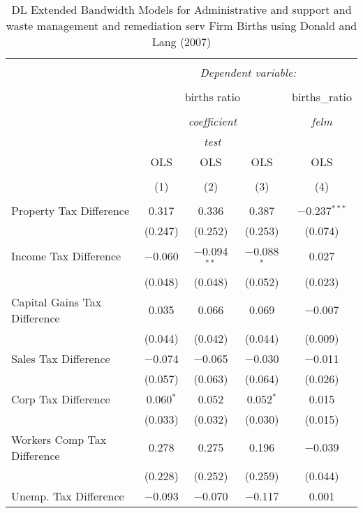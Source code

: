 
\begin{table}[!htbp] \centering 
  \caption{DL Extended Bandwidth Models for  Administrative and support and waste management and remediation serv Firm Births using Donald and Lang (2007)} 
  \label{} 
\begin{tabular}{@{\extracolsep{5pt}}lcccc} 
\\[-1.8ex]\hline 
\hline \\[-1.8ex] 
 & \multicolumn{4}{c}{\textit{Dependent variable:}} \\ 
\cline{2-5} 
\\[-1.8ex] & \multicolumn{3}{c}{births ratio} & births\_ratio \\ 
\\[-1.8ex] & \multicolumn{3}{c}{\textit{coefficient}} & \textit{felm} \\ 
 & \multicolumn{3}{c}{\textit{test}} & \textit{} \\ 
 & OLS & OLS & OLS & OLS \\ 
\\[-1.8ex] & (1) & (2) & (3) & (4)\\ 
\hline \\[-1.8ex] 
 Property Tax Difference & 0.317 & 0.336 & 0.387 & $-$0.237$^{***}$ \\ 
  & (0.247) & (0.252) & (0.253) & (0.074) \\ 
  Income Tax Difference & $-$0.060 & $-$0.094$^{**}$ & $-$0.088$^{*}$ & 0.027 \\ 
  & (0.048) & (0.048) & (0.052) & (0.023) \\ 
  Capital Gains Tax Difference & 0.035 & 0.066 & 0.069 & $-$0.007 \\ 
  & (0.044) & (0.042) & (0.044) & (0.009) \\ 
  Sales Tax Difference & $-$0.074 & $-$0.065 & $-$0.030 & $-$0.011 \\ 
  & (0.057) & (0.063) & (0.064) & (0.026) \\ 
  Corp Tax Difference & 0.060$^{*}$ & 0.052 & 0.052$^{*}$ & 0.015 \\ 
  & (0.033) & (0.032) & (0.030) & (0.015) \\ 
  Workers Comp Tax Difference & 0.278 & 0.275 & 0.196 & $-$0.039 \\ 
  & (0.228) & (0.252) & (0.259) & (0.044) \\ 
  Unemp. Tax Difference & $-$0.093 & $-$0.070 & $-$0.117 & 0.001 \\ 

\end{tabular}
\end{table}
